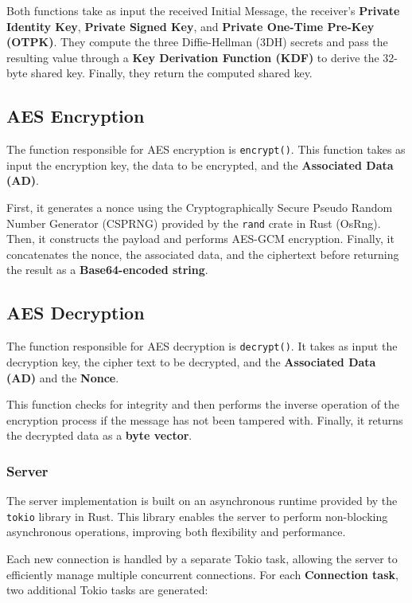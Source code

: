 Both functions take as input the received Initial Message, the receiver's \textbf{Private Identity Key}, \textbf{Private Signed Key}, and \textbf{Private One-Time Pre-Key (OTPK)}. They compute the three Diffie-Hellman (3DH) secrets and pass the resulting value through a \textbf{Key Derivation Function (KDF)} to derive the 32-byte shared key. Finally, they return the computed shared key.  

\subsection{AES Encryption}
\label{subsec:AESEncryption}

The function responsible for AES encryption is \texttt{encrypt()}. This function takes as input the encryption key, the data to be encrypted, and the \textbf{Associated Data (AD)}.

First, it generates a nonce using the Cryptographically Secure Pseudo Random Number Generator (CSPRNG) provided by the \texttt{rand} crate in Rust (OsRng). Then, it constructs the payload and performs AES-GCM encryption. Finally, it concatenates the nonce, the associated data, and the ciphertext before returning the result as a \textbf{Base64-encoded string}.

\subsection{AES Decryption}
\label{subsec:AESDecryption}

The function responsible for AES decryption is \texttt{decrypt()}. It takes as input the decryption key, the cipher text to be decrypted, and the \textbf{Associated Data (AD)} and the \textbf{Nonce}.

This function checks for integrity and then performs the inverse operation of the encryption process if the message has not been tampered with. Finally, it returns the decrypted data as a \textbf{byte vector}.

\subsubsection{Server}
\label{subsec:Server}

The server implementation is built on an asynchronous runtime provided by the \texttt{tokio} library in Rust. This library enables the server to perform non-blocking asynchronous operations, improving both flexibility and performance.  

Each new connection is handled by a separate Tokio task, allowing the server to efficiently manage multiple concurrent connections. For each \textbf{Connection task}, two additional Tokio tasks are generated:


